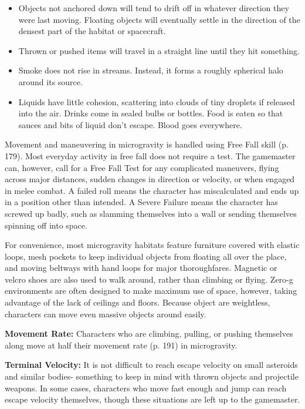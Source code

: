 \begin{itemize}
\item Objects not anchored down will tend to drift off in whatever direction they were last moving. Floating objects will eventually settle in the direction of the densest part of the habitat or spacecraft.
\item Thrown or pushed items will travel in a straight line until they hit something.
\item Smoke does not rise in streams. Instead, it forms a roughly spherical halo around its source.
\item Liquids have little cohesion, scattering into clouds of tiny droplets if released into the air. Drinks come in sealed bulbs or bottles. Food is eaten so that sauces and bits of liquid don’t escape. Blood goes everywhere.
\end{itemize}

Movement and maneuvering in microgravity is handled using Free Fall skill (p. 179). Most everyday activity in free fall does not require a test. The gamemaster can, however, call for a Free Fall Test for any complicated maneuvers, flying across major distances, sudden changes in direction or velocity, or when engaged in melee combat. A failed roll means the character has miscalculated and ends up in a position other than intended. A Severe Failure means the character has screwed up badly, such as slamming themselves into a wall or sending themselves spinning off into space.

For convenience, most microgravity habitats feature furniture covered with elastic loops, mesh pockets to keep individual objects from floating all over the place, and moving beltways with hand loops for major thoroughfares. Magnetic or velcro shoes are also used to walk around, rather than climbing or flying. Zero-g environments are often designed to make maximum use of space, however, taking advantage of the lack of ceilings and floors. Because object are weightless, characters can move even massive objects around easily.

\textbf{Movement Rate:} Characters who are climbing, pulling, or pushing themselves along move at half their movement rate (p. 191) in microgravity.

\textbf{Terminal Velocity:} It is not difficult to reach escape velocity on small asteroids and similar bodies- something to keep in mind with thrown objects and projectile weapons. In some cases, characters who move fast enough and jump can reach escape velocity themselves, though these situations are left up to the gamemaster.

